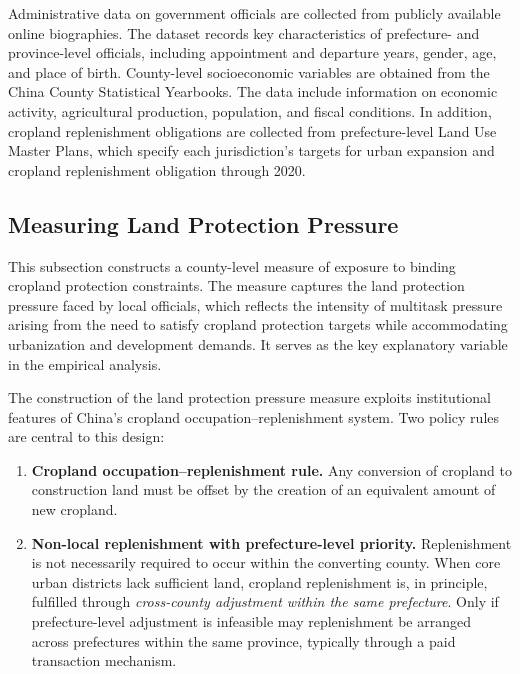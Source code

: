 Administrative data on government officials are collected from publicly available online biographies. The dataset records key characteristics of prefecture- and province-level officials, including appointment and departure years, gender, age, and place of birth. County-level socioeconomic variables are obtained from the China County Statistical Yearbooks. The data include information on economic activity, agricultural production, population, and fiscal conditions. In addition, cropland replenishment obligations are collected from prefecture-level Land Use Master Plans, which specify each jurisdiction’s targets for urban expansion and cropland replenishment obligation through 2020.


\subsection{Measuring Land Protection Pressure}


This subsection constructs a county-level measure of exposure to binding cropland protection constraints. The measure captures the land protection pressure faced by local officials, which reflects the intensity of multitask pressure arising from the need to satisfy cropland protection targets while accommodating urbanization and development demands. It serves as the key explanatory variable in the empirical analysis. 

The construction of the land protection pressure measure exploits institutional features of China’s cropland occupation--replenishment system. Two policy rules are central to this design:

\begin{enumerate}
    \item \textbf{Cropland occupation--replenishment rule.} Any conversion of cropland to construction land must be offset by the creation of an equivalent amount of new cropland.
    
    \item \textbf{Non-local replenishment with prefecture-level priority.} Replenishment is not necessarily required to occur within the converting county. When core urban districts lack sufficient land, cropland replenishment is, in principle, fulfilled through \emph{cross-county adjustment within the same prefecture}. Only if prefecture-level adjustment is infeasible may replenishment be arranged across prefectures within the same province, typically through a paid transaction mechanism.
\end{enumerate}

